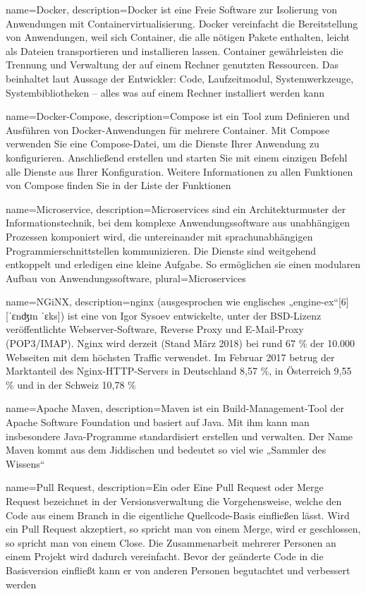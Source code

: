 {
    name=Docker,
    description={Docker ist eine Freie Software zur Isolierung von Anwendungen mit Containervirtualisierung. Docker vereinfacht die Bereitstellung von Anwendungen, weil sich Container, die alle nötigen Pakete enthalten, leicht als Dateien transportieren und installieren lassen. Container gewährleisten die Trennung und Verwaltung der auf einem Rechner genutzten Ressourcen. Das beinhaltet laut Aussage der Entwickler: Code, Laufzeitmodul, Systemwerkzeuge, Systembibliotheken – alles was auf einem Rechner installiert werden kann}
}

{
    name=Docker-Compose,
    description={Compose ist ein Tool zum Definieren und Ausführen von Docker-Anwendungen für mehrere Container. Mit Compose verwenden Sie eine Compose-Datei, um die Dienste Ihrer Anwendung zu konfigurieren. Anschließend erstellen und starten Sie mit einem einzigen Befehl alle Dienste aus Ihrer Konfiguration. Weitere Informationen zu allen Funktionen von Compose finden Sie in der Liste der Funktionen}
}

{
    name=Microservice,
    description={Microservices sind ein Architekturmuster der Informationstechnik, bei dem komplexe Anwendungssoftware aus unabhängigen Prozessen komponiert wird, die untereinander mit sprachunabhängigen Programmierschnittstellen kommunizieren. Die Dienste sind weitgehend entkoppelt und erledigen eine kleine Aufgabe. So ermöglichen sie einen modularen Aufbau von Anwendungssoftware},
    plural={Microservices}
}

{
    name=NGiNX,
    description={nginx (ausgesprochen wie englisches „engine-ex“[6] [ˈɛnʤɪn ˈɛks]) ist eine von Igor Sysoev entwickelte, unter der BSD-Lizenz veröffentlichte Webserver-Software, Reverse Proxy und E-Mail-Proxy (POP3/IMAP). Nginx wird derzeit (Stand März 2018) bei rund 67 \% der 10.000 Webseiten mit dem höchsten Traffic verwendet. Im Februar 2017 betrug der Marktanteil des Nginx-HTTP-Servers in Deutschland 8,57 \%, in Österreich 9,55 \% und in der Schweiz 10,78 \%}
}

{
    name=Apache Maven,
    description={Maven ist ein Build-Management-Tool der Apache Software Foundation und basiert auf Java. Mit ihm kann man insbesondere Java-Programme standardisiert erstellen und verwalten. Der Name Maven kommt aus dem Jiddischen und bedeutet so viel wie „Sammler des Wissens“}
}

{
    name=Pull Request,
    description={Ein oder Eine Pull Request oder Merge Request bezeichnet in der Versionsverwaltung die Vorgehensweise, welche den Code aus einem Branch in die eigentliche Quellcode-Basis einfließen lässt. Wird ein Pull Request akzeptiert, so spricht man von einem Merge, wird er geschlossen, so spricht man von einem Close. Die Zusammenarbeit mehrerer Personen an einem Projekt wird dadurch vereinfacht. Bevor der geänderte Code in die Basisversion einfließt kann er von anderen Personen begutachtet und verbessert werden}
}

